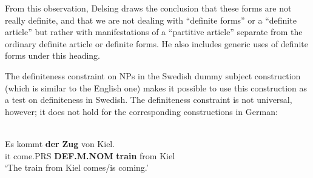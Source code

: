 From this observation, Delsing draws the conclusion that these forms are not really definite, and that we are not dealing with “definite forms” or a “definite article” but rather with manifestations of a “partitive article” separate from the ordinary definite article or definite forms. He also includes generic uses of definite forms under this heading. 

The definiteness constraint on NPs in the Swedish dummy subject construction (which is similar to the English one) makes it possible to use this construction as a test on definiteness in Swedish. The definiteness constraint is not universal, however; it does not hold for the corresponding constructions in German:

\ea \label{} 
\\
\gll Es  kommt  \textbf{der} \textbf{  Zug} von  Kiel.\\
it  come.PRS  \textbf{DEF.M.NOM} \textbf{train} from  Kiel\\
\glt ‘The train from Kiel comes/is coming.’

\z

